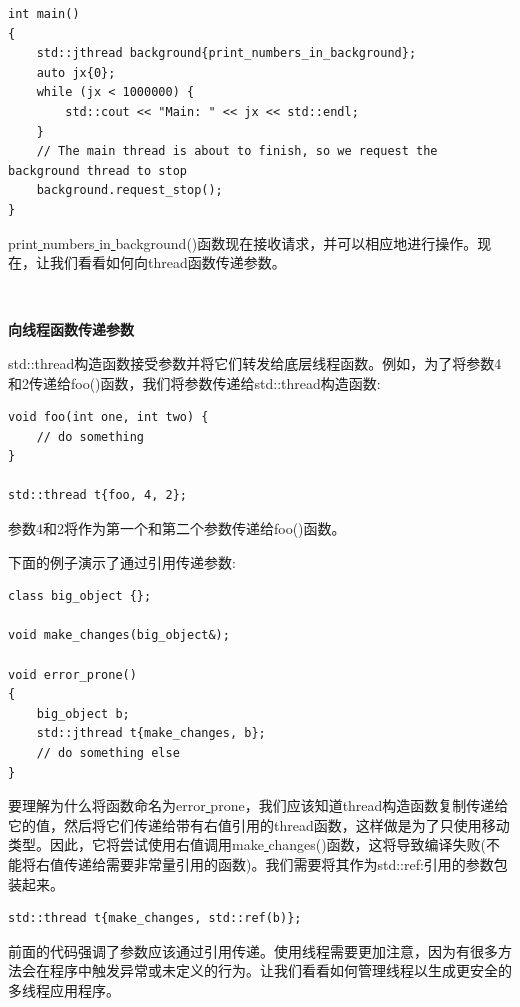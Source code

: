 \begin{lstlisting}[caption={}]
int main()
{
	std::jthread background{print_numbers_in_background};
	auto jx{0};
	while (jx < 1000000) {
		std::cout << "Main: " << jx << std::endl;
	}
	// The main thread is about to finish, so we request the background thread to stop
	background.request_stop();
}
\end{lstlisting}

print\underline{ }numbers\underline{ }in\underline{ }background()函数现在接收请求，并可以相应地进行操作。现在，让我们看看如何向thread函数传递参数。 \par

\noindent\textbf{}\ \par
\textbf{向线程函数传递参数} \ \par
std::thread构造函数接受参数并将它们转发给底层线程函数。例如，为了将参数4和2传递给foo()函数，我们将参数传递给std::thread构造函数: \par

\begin{lstlisting}[caption={}]
void foo(int one, int two) {
	// do something
}

std::thread t{foo, 4, 2};
\end{lstlisting}

参数4和2将作为第一个和第二个参数传递给foo()函数。 \par
下面的例子演示了通过引用传递参数: \par

\begin{lstlisting}[caption={}]
class big_object {};

void make_changes(big_object&);

void error_prone()
{
	big_object b;
	std::jthread t{make_changes, b};
	// do something else
}
\end{lstlisting}

要理解为什么将函数命名为error\underline{ }prone，我们应该知道thread构造函数复制传递给它的值，然后将它们传递给带有右值引用的thread函数，这样做是为了只使用移动类型。因此，它将尝试使用右值调用make\underline{ }changes()函数，这将导致编译失败(不能将右值传递给需要非常量引用的函数)。我们需要将其作为std::ref:引用的参数包装起来。 \par

\begin{lstlisting}[caption={}]
std::thread t{make_changes, std::ref(b)};
\end{lstlisting}

前面的代码强调了参数应该通过引用传递。使用线程需要更加注意，因为有很多方法会在程序中触发异常或未定义的行为。让我们看看如何管理线程以生成更安全的多线程应用程序。 \par

